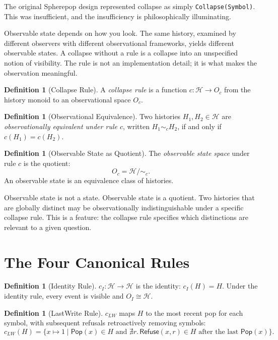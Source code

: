 \documentclass[12pt, a4paper, openany]{book}
\theoremstyle{plain}
\theoremstyle{definition}
\newtheorem{definition}[theorem]{Definition}
\theoremstyle{remark}
\newcommand{\Pop}{\mathsf{Pop}}
\newcommand{\Refuse}{\mathsf{Refuse}}
\newcommand{\calH}{\mathcal{H}}
\begin{document}
The original Spherepop design represented collapse as simply \texttt{Collapse(Symbol)}.
This was insufficient, and the insufficiency is philosophically illuminating.

Observable state depends on how you look. The same history, examined by different
observers with different observational frameworks, yields different observable
states. A collapse without a rule is a collapse into an unspecified notion of
visibility. The rule is not an implementation detail; it is what makes the
observation meaningful.

\begin{definition}[Collapse Rule]
A \emph{collapse rule} is a function $c : \calH \to O_c$ from the history monoid
to an observational space $O_c$.
\end{definition}

\begin{definition}[Observational Equivalence]
Two histories $H_1, H_2 \in \calH$ are \emph{observationally equivalent under
rule $c$}, written $H_1 \sim_c H_2$, if and only if $c(H_1) = c(H_2)$.
\end{definition}

\begin{definition}[Observable State as Quotient]
The \emph{observable state space} under rule $c$ is the quotient:
\[
O_c = \calH / {\sim_c}.
\]
An observable state is an equivalence class of histories.
\end{definition}

Observable state is not a state. Observable state is a quotient. Two histories
that are globally distinct may be observationally indistinguishable under a
specific collapse rule. This is a feature: the collapse rule specifies which
distinctions are relevant to a given question.

\section{The Four Canonical Rules}

\begin{definition}[Identity Rule]
$c_I : \calH \to \calH$ is the identity: $c_I(H) = H$. Under the identity rule,
every event is visible and $O_I \cong \calH$.
\end{definition}

\begin{definition}[LastWrite Rule]
$c_{LW}$ maps $H$ to the most recent pop for each symbol, with subsequent refusals
retroactively removing symbols:
\[
c_{LW}(H) = \{x \mapsto 1 \mid \Pop(x) \in H \text{ and } \nexists r.\, \Refuse(x,r) \in H \text{ after the last } \Pop(x)\}.
\]
\end{definition}
\end{document}
